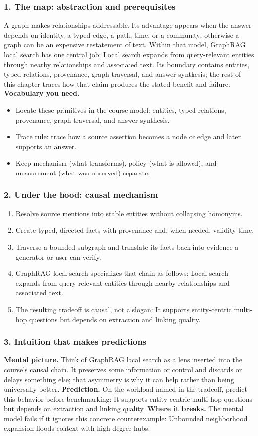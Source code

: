 \subsubsection*{1. The map: abstraction and prerequisites}
A graph makes relationships addressable. Its advantage appears when the answer depends on identity, a typed edge, a path, time, or a community; otherwise a graph can be an expensive restatement of text.
Within that model, GraphRAG local search has one central job: Local search expands from query-relevant entities through nearby relationships and associated text. Its boundary contains entities, typed relations, provenance, graph traversal, and answer synthesis; the rest of this chapter traces how that claim produces the stated benefit and failure.
\textbf{Vocabulary you need.}\begin{itemize}
\item Locate these primitives in the course model: entities, typed relations, provenance, graph traversal, and answer synthesis.
\item Trace rule: trace how a source assertion becomes a node or edge and later supports an answer.
\item Keep mechanism (what transforms), policy (what is allowed), and measurement (what was observed) separate.
\end{itemize}
\subsubsection*{2. Under the hood: causal mechanism}\begin{enumerate}
\item Resolve source mentions into stable entities without collapsing homonyms.
\item Create typed, directed facts with provenance and, when needed, validity time.
\item Traverse a bounded subgraph and translate its facts back into evidence a generator or user can verify.
\item GraphRAG local search specializes that chain as follows: Local search expands from query-relevant entities through nearby relationships and associated text.
\item The resulting tradeoff is causal, not a slogan: It supports entity-centric multi-hop questions but depends on extraction and linking quality.
\end{enumerate}
\subsubsection*{3. Intuition that makes predictions}
\textbf{Mental picture.} Think of GraphRAG local search as a lens inserted into the course's causal chain. It preserves some information or control and discards or delays something else; that asymmetry is why it can help rather than being universally better.
\textbf{Prediction.} On the workload named in the tradeoff, predict this behavior before benchmarking: It supports entity-centric multi-hop questions but depends on extraction and linking quality.
\textbf{Where it breaks.} The mental model fails if it ignores this concrete counterexample: Unbounded neighborhood expansion floods context with high-degree hubs.
